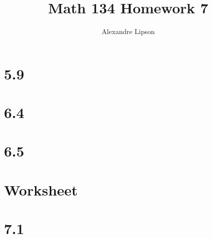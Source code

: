 \documentclass{article}
\title{Math 134 Homework 7}
\author{Alexandre Lipson}
\begin{document}
\maketitle

\section*{5.9}


\section*{6.4}


\section*{6.5}


\section*{Worksheet}


\section*{7.1}

\end{document}
